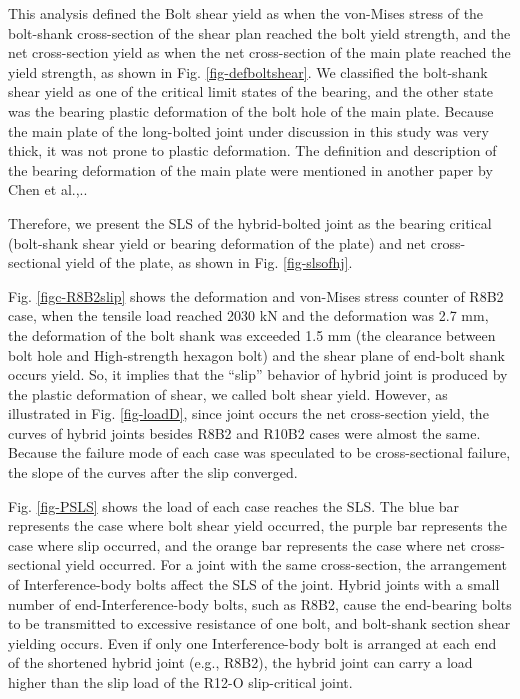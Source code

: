 This analysis defined the \ac{Bolt shear yield} as when the von-Mises stress of the bolt-shank cross-section of the shear plan reached the bolt yield strength, and the net cross-section yield as when the net cross-section of the main plate reached the yield strength, as shown in Fig. \ref{fig-defboltshear}. We classified the bolt-shank shear yield as one of the critical limit states of the bearing, and the other state was the bearing plastic deformation of the bolt hole of the main plate. Because the main plate of the long-bolted joint under discussion in this study was very thick, it was not prone to plastic deformation. The definition and description of the bearing deformation of the main plate were mentioned in another paper by Chen et al.,.\cite{chen2022jp}.

Therefore, we present the SLS of the hybrid-bolted joint as the bearing critical (bolt-shank shear yield or bearing deformation of the plate) and net cross-sectional yield of the plate, as shown in Fig. \ref{fig-slsofhj}.

Fig. \ref{figc-R8B2slip} shows the deformation and von-Mises stress counter of R8B2 case, when the tensile load reached 2030 kN and the deformation was 2.7 mm, the deformation of the bolt shank was exceeded 1.5 mm (the clearance between bolt hole and High-strength hexagon bolt) and the shear plane of end-bolt shank occurs yield. So, it implies that the ``slip'' behavior of hybrid joint is produced by the plastic deformation of shear, we called bolt shear yield. However, as illustrated in Fig. \ref{fig-loadD}, since joint occurs the net cross-section yield, the curves of hybrid joints besides R8B2 and R10B2 cases were almost the same. Because the failure mode of each case was speculated to be cross-sectional failure, the slope of the curves after the slip converged. 

Fig. \ref{fig-PSLS} shows the load of each case reaches the SLS. The blue bar represents the case where bolt shear yield occurred, the purple bar represents the case where slip occurred, and the orange bar represents the case where net cross-sectional yield occurred. For a joint with the same cross-section, the arrangement of Interference-body bolts affect the SLS of the joint. Hybrid joints with a small number of end-Interference-body bolts, such as R8B2, cause the end-bearing bolts to be transmitted to excessive resistance of one bolt, and bolt-shank section shear yielding occurs. Even if only one Interference-body bolt is arranged at each end of the shortened hybrid joint (e.g., R8B2), the hybrid joint can carry a load higher than the slip load of the R12-O slip-critical joint.

